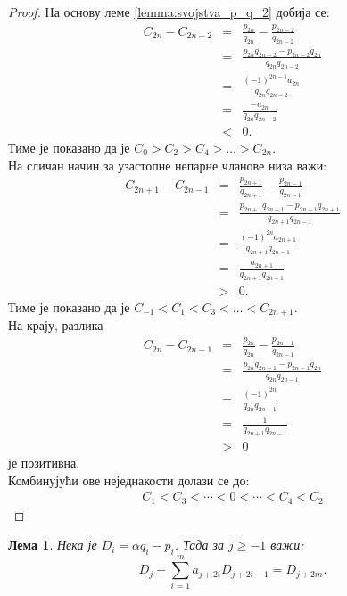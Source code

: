 \documentclass[a4paper]{article}
\newtheorem{lemma}{Лема}
\begin{document}
\begin{proof}
	На основу леме \ref{lemma:svojstva_p_q_2} добија се:
	\begin{eqnarray*}
		C_{2n} - C_{2n-2} &=& \frac{p_{2n}}{q_{2n}} - \frac{p_{2n-2}}{q_{2n-2}}\\
						  &=& \frac{p_{2n}q_{2n-2} - p_{2n-2}q_{2n}}{q_{2n}q_{2n-2}}\\
						  &=& \frac{(-1)^{2n-1}a_{2n}}{q_{2n}q_{2n-2}}\\
						  &=& \frac{-a_{2n}}{q_{2n}q_{2n-2}}\\
						  &<& 0.
	\end{eqnarray*}
	Тиме је показано да је $ C_{0} > C_{2} > C_{4} > \ldots > C_{2n} $.\\
	На сличан начин за узастопне непарне чланове низа важи:
	\begin{eqnarray*}
		C_{2n+1} - C_{2n-1} &=& \frac{p_{2n+1}}{q_{2n+1}} - \frac{p_{2n-1}}{q_{2n-1}}\\
		&=& \frac{p_{2n+1}q_{2n-1} - p_{2n-1}q_{2n+1}}{q_{2n+1}q_{2n-1}}\\
		&=& \frac{(-1)^{2n}a_{2n+1}}{q_{2n+1}q_{2n-1}}\\
		&=& \frac{a_{2n+1}}{q_{2n+1}q_{2n-1}}\\
		&>& 0.
	\end{eqnarray*}
	Тиме је показано да је $ C_{-1} < C_{1} < C_{3} < \ldots < C_{2n+1} $.\\
	На крају, разлика
	\begin{eqnarray*}
		C_{2n} - C_{2n-1} &=& \frac{p_{2n}}{q_{2n}} - \frac{p_{2n-1}}{q_{2n-1}}\\
		&=& \frac{p_{2n}q_{2n-1} - p_{2n-1}q_{2n}}{q_{2n}q_{2n-1}}\\
		&=& \frac{(-1)^{2n}}{q_{2n}q_{2n-1}}\\
		&=& \frac{1}{q_{2n+1}q_{2n-1}}\\
		&>& 0
	\end{eqnarray*}
	је позитивна.\\
	Комбинујући ове неједнакости долази се до:
	\begin{eqnarray*}
		C_{1} < C_{3} < \cdots < 0 < \cdots < C_{4} < C_{2} 
	\end{eqnarray*}	
\end{proof}

\begin{lemma}
	\label{lemma:svojstva_konvergenata_2}
	Нека је $ D_{i} = \alpha q_{i} - p_{i} $. Тада за $ j \ge -1 $ важи:
	\begin{displaymath}
		D_{j} + \sum_{i=1}^{m} a_{j+2i}D_{j+2i-1} = D_{j+2m}.
	\end{displaymath}
\end{lemma}
\end{document}
